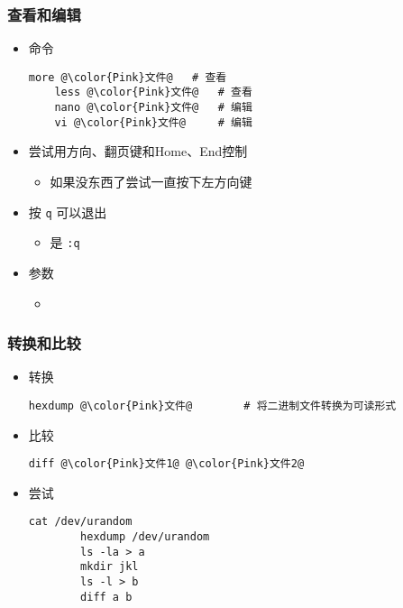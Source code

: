 \begin{CJK}{UTF8}{gbsn}
\begin{frame} [fragile]
	\frametitle{查看和编辑}
	\linespread{1.25}
	\begin{itemize}
	\item 命令
	\begin{lstlisting}[style=bashstyle, gobble=4, texcl, escapechar=@]
	more @\color{Pink}文件@	# 查看
	less @\color{Pink}文件@	# 查看
	nano @\color{Pink}文件@	# 编辑
	vi @\color{Pink}文件@		# 编辑
	\end{lstlisting}
	\item 尝试用方向、翻页键和Home、End控制
		\begin{itemize}
		\item 如果没东西了尝试一直按下左方向键
		\end{itemize}
	\item 按 \texttt{q} 可以退出
		\begin{itemize}
		\item {}是 \texttt{:q}
		\end{itemize}
	\item 参数
		\begin{itemize}
		\item {}
		\end{itemize}
	\end{itemize}
\end{frame}

\begin{frame} [fragile]
	\frametitle{转换和比较}
	\linespread{1.25}
	\begin{itemize}
	\item 转换
		\begin{lstlisting}[style=bashstyle, gobble=8, texcl, escapechar=@]
		hexdump @\color{Pink}文件@		# 将二进制文件转换为可读形式
		\end{lstlisting}
	\item 比较
		\begin{lstlisting}[style=bashstyle, gobble=8, texcl, escapechar=@]
		diff @\color{Pink}文件1@ @\color{Pink}文件2@
		\end{lstlisting}
	\item 尝试
		\begin{lstlisting}[style=bashstyle, gobble=8, texcl, escapechar=@]
		cat /dev/urandom
		hexdump /dev/urandom
		ls -la > a
		mkdir jkl
		ls -l > b
		diff a b
		\end{lstlisting}
	\end{itemize}
\end{frame}


\end{CJK}

